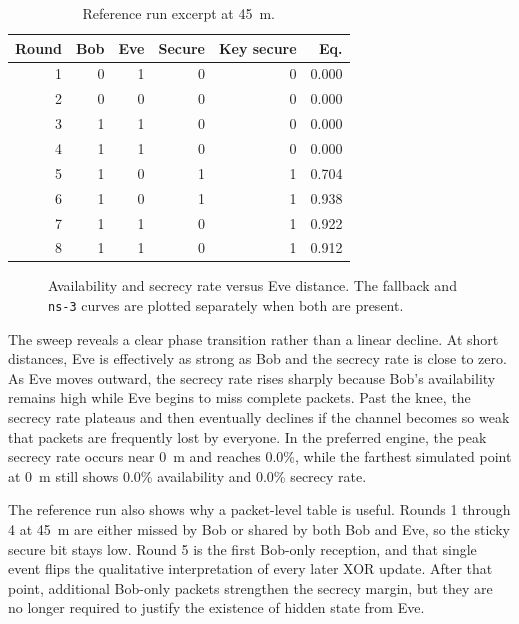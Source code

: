 \documentclass[11pt]{article}
\newcommand{\ReferenceDistanceMeters}{45}
\newcommand{\PeakSecrecyDistanceMeters}{0}
\newcommand{\PeakSecrecyPct}{0.0}
\newcommand{\LateDistanceMeters}{0}
\newcommand{\LateAvailabilityPct}{0.0}
\newcommand{\LateSecrecyPct}{0.0}
\begin{document}
\begin{table}[t]
\centering
\caption{Reference run excerpt at \SI{\ReferenceDistanceMeters}{m}.}
\begin{tabular}{rrrrrr}
\toprule
Round & Bob & Eve & Secure & Key secure & Eq. \\
\midrule
1 & 0 & 1 & 0 & 0 & 0.000 \\
2 & 0 & 0 & 0 & 0 & 0.000 \\
3 & 1 & 1 & 0 & 0 & 0.000 \\
4 & 1 & 1 & 0 & 0 & 0.000 \\
5 & 1 & 0 & 1 & 1 & 0.704 \\
6 & 1 & 0 & 1 & 1 & 0.938 \\
7 & 1 & 1 & 0 & 1 & 0.922 \\
8 & 1 & 1 & 0 & 1 & 0.912 \\
\bottomrule
\end{tabular}
\end{table}

\begin{figure}[t]
\centering

\caption{Availability and secrecy rate versus Eve distance. The fallback and \texttt{ns-3} curves are plotted separately when both are present.}
\end{figure}

The sweep reveals a clear phase transition rather than a linear decline. At short distances, Eve is effectively as strong as Bob and the secrecy rate is close to zero. As Eve moves outward, the secrecy rate rises sharply because Bob's availability remains high while Eve begins to miss complete packets. Past the knee, the secrecy rate plateaus and then eventually declines if the channel becomes so weak that packets are frequently lost by everyone. In the preferred engine, the peak secrecy rate occurs near \SI{\PeakSecrecyDistanceMeters}{m} and reaches \PeakSecrecyPct\%, while the farthest simulated point at \SI{\LateDistanceMeters}{m} still shows \LateAvailabilityPct\% availability and \LateSecrecyPct\% secrecy rate.

The reference run also shows why a packet-level table is useful. Rounds 1 through 4 at \SI{\ReferenceDistanceMeters}{m} are either missed by Bob or shared by both Bob and Eve, so the sticky secure bit stays low. Round 5 is the first Bob-only reception, and that single event flips the qualitative interpretation of every later XOR update. After that point, additional Bob-only packets strengthen the secrecy margin, but they are no longer required to justify the existence of hidden state from Eve.
\end{document}
